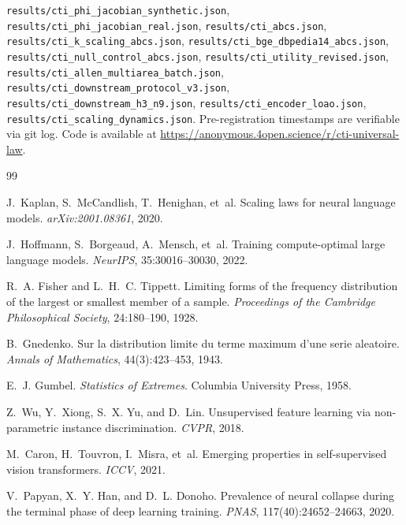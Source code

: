 \documentclass{article}
\begin{document}
\texttt{results/cti\_phi\_jacobian\_synthetic.json}, \texttt{results/cti\_phi\_jacobian\_real.json}, \texttt{results/cti\_abcs.json}, \texttt{results/cti\_k\_scaling\_abcs.json}, \texttt{results/cti\_bge\_dbpedia14\_abcs.json}, \texttt{results/cti\_null\_control\_abcs.json}, \texttt{results/cti\_utility\_revised.json}, \texttt{results/cti\_allen\_multiarea\_batch.json}, \texttt{results/cti\_downstream\_protocol\_v3.json}, \texttt{results/cti\_downstream\_h3\_n9.json}, \texttt{results/cti\_encoder\_loao.json}, \texttt{results/cti\_scaling\_dynamics.json}. Pre-registration timestamps are verifiable via git log. Code is available at \url{https://anonymous.4open.science/r/cti-universal-law}.

\begin{thebibliography}{99}

J.~Kaplan, S.~McCandlish, T.~Henighan, et~al.
\newblock Scaling laws for neural language models.
\newblock \emph{arXiv:2001.08361}, 2020.

J.~Hoffmann, S.~Borgeaud, A.~Mensch, et~al.
\newblock Training compute-optimal large language models.
\newblock \emph{NeurIPS}, 35:30016--30030, 2022.

R.~A. Fisher and L.~H.~C. Tippett.
\newblock Limiting forms of the frequency distribution of the largest or smallest member of a sample.
\newblock \emph{Proceedings of the Cambridge Philosophical Society}, 24:180--190, 1928.

B.~Gnedenko.
\newblock Sur la distribution limite du terme maximum d'une serie aleatoire.
\newblock \emph{Annals of Mathematics}, 44(3):423--453, 1943.

E.~J. Gumbel.
\newblock \emph{Statistics of Extremes}.
\newblock Columbia University Press, 1958.

Z.~Wu, Y.~Xiong, S.~X. Yu, and D.~Lin.
\newblock Unsupervised feature learning via non-parametric instance discrimination.
\newblock \emph{CVPR}, 2018.

M.~Caron, H.~Touvron, I.~Misra, et~al.
\newblock Emerging properties in self-supervised vision transformers.
\newblock \emph{ICCV}, 2021.

V.~Papyan, X.~Y. Han, and D.~L. Donoho.
\newblock Prevalence of neural collapse during the terminal phase of deep learning training.
\newblock \emph{PNAS}, 117(40):24652--24663, 2020.


\end{thebibliography}
\end{document}
